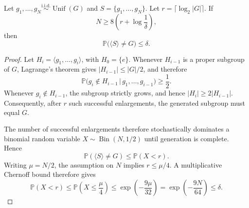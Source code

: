 \documentclass[10pt,a4paper]{amsart}
\begin{document}
\begin{proposition}
\label{prop:random_generators}
Let \(g_1,\ldots,g_N\overset{\mathrm{i.i.d.}}{\sim}\operatorname{Unif}(G)\)
and \(S=\{g_1,\ldots,g_N\}\). Let
\(r=\lceil\log_2|G|\rceil\). If
\[
N\ge
8\left(
r+\log\frac{1}{\delta}
\right),
\]
then
\[
\mathbb P\bigl(\langle S\rangle\neq G\bigr)\le\delta.
\]
\end{proposition}

\begin{proof}
Let \(H_i=\langle g_1,\ldots,g_i\rangle\), with \(H_0=\{e\}\). Whenever
\(H_{i-1}\) is a proper subgroup of \(G\), Lagrange's theorem gives
\(|H_{i-1}|\le |G|/2\), and therefore
\[
\mathbb P
\bigl(
g_i\notin H_{i-1}
\,\big|\,
g_1,\ldots,g_{i-1}
\bigr)
\ge\frac12.
\]
Whenever \(g_i\notin H_{i-1}\), the subgroup strictly grows, and hence
\(|H_i|\ge2|H_{i-1}|\). Consequently, after \(r\) such successful
enlargements, the generated subgroup must equal \(G\).

The number of successful enlargements therefore stochastically dominates a
binomial random variable \(X\sim\operatorname{Bin}(N,1/2)\) until generation
is complete. Hence
\[
\mathbb P(\langle S\rangle\neq G)
\le
\mathbb P(X<r).
\]
Writing \(\mu=N/2\), the assumption on \(N\) implies \(r\le\mu/4\). A
multiplicative Chernoff bound therefore gives
\[
\mathbb P(X<r)
\le
\mathbb P\left(X\le\frac{\mu}{4}\right)
\le
\exp\left(-\frac{9\mu}{32}\right)
=
\exp\left(-\frac{9N}{64}\right)
\le\delta.
\]
\end{proof}
\end{document}
